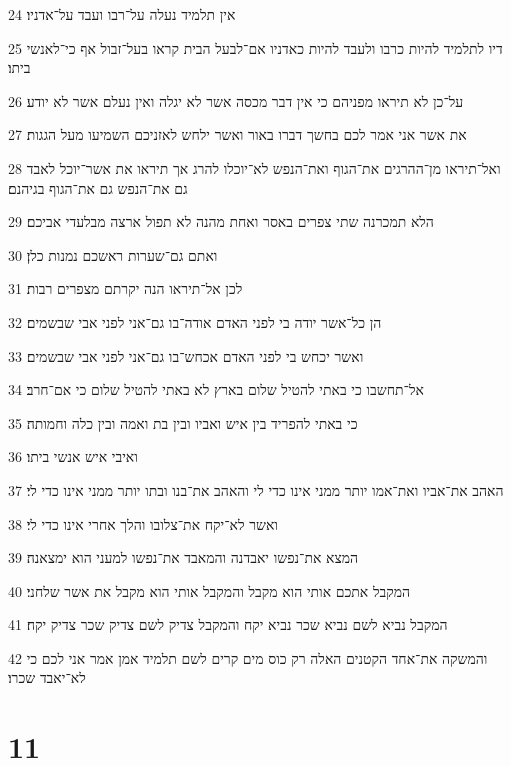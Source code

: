 \par 24 אין תלמיד נעלה על־רבו ועבד על־אדניו׃
\par 25 דיו לתלמיד להיות כרבו ולעבד להיות כאדניו אם־לבעל הבית קראו בעל־זבול אף כי־לאנשי ביתו׃
\par 26 על־כן לא תיראו מפניהם כי אין דבר מכסה אשר לא יגלה ואין נעלם אשר לא יודע׃
\par 27 את אשר אני אמר לכם בחשך דברו באור ואשר ילחש לאזניכם השמיעו מעל הגגות׃
\par 28 ואל־תיראו מן־ההרגים את־הגוף ואת־הנפש לא־יוכלו להרג אך תיראו את אשר־יוכל לאבד גם את־הנפש גם את־הגוף בגיהנם׃
\par 29 הלא תמכרנה שתי צפרים באסר ואחת מהנה לא תפול ארצה מבלעדי אביכם׃
\par 30 ואתם גם־שערות ראשכם נמנות כלן׃
\par 31 לכן אל־תיראו הנה יקרתם מצפרים רבות׃
\par 32 הן כל־אשר יודה בי לפני האדם אודה־בו גם־אני לפני אבי שבשמים׃
\par 33 ואשר יכחש בי לפני האדם אכחש־בו גם־אני לפני אבי שבשמים׃
\par 34 אל־תחשבו כי באתי להטיל שלום בארץ לא באתי להטיל שלום כי אם־חרב׃
\par 35 כי באתי להפריד בין איש ואביו ובין בת ואמה ובין כלה וחמותה׃
\par 36 ואיבי איש אנשי ביתו׃
\par 37 האהב את־אביו ואת־אמו יותר ממני אינו כדי לי והאהב את־בנו ובתו יותר ממני אינו כדי לי׃
\par 38 ואשר לא־יקח את־צלובו והלך אחרי אינו כדי לי׃
\par 39 המצא את־נפשו יאבדנה והמאבד את־נפשו למעני הוא ימצאנה׃
\par 40 המקבל אתכם אותי הוא מקבל והמקבל אותי הוא מקבל את אשר שלחני׃
\par 41 המקבל נביא לשם נביא שכר נביא יקח והמקבל צדיק לשם צדיק שכר צדיק יקח׃
\par 42 והמשקה את־אחד הקטנים האלה רק כוס מים קרים לשם תלמיד אמן אמר אני לכם כי לא־יאבד שכרו׃

\chapter{11}

